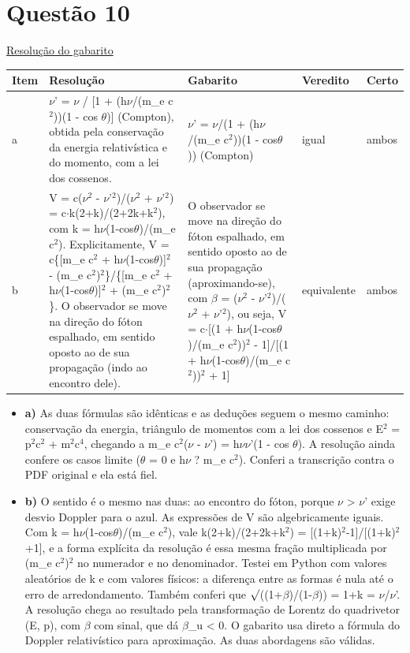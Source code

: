 \documentclass{article}%
\begin{document}
\section*{Questão 10}%
\href{https://poliedroresolve.sistemapoliedro.com.br/vestibulares/ita/2027/ita-2-fase-dia-3-22-10-2026-2-fase-dia-3/dissertativa-10-fisica-2-fase-dia-3-ita-2027}{Resolução do gabarito}\par\smallskip%
\begin{longtable}{@{}p{} p{} p{} p{} p{}@{}}\toprule Item & Resolução & Gabarito & Veredito & Certo \\ \midrule
a & $\nu$' = $\nu$ / {[}1 + (h$\nu$/(m\_e c$^2$))(1 - cos $\theta$){]} (Compton), obtida pela conservação da energia relativística e do momento, com a lei dos cossenos. & $\nu$' = $\nu$/(1 + (h$\nu$/(m\_e c$^2$))(1 - cos$\theta$)) (Compton) & igual & ambos \\
b & V = c($\nu$$^2$ - $\nu$'$^2$)/($\nu$$^2$ + $\nu$'$^2$) = c$\cdot$k(2+k)/(2+2k+k$^2$), com k = h$\nu$(1-cos$\theta$)/(m\_e c$^2$). Explicitamente, V = c\{{[}m\_e c$^2$ + h$\nu$(1-cos$\theta$){]}$^2$ - (m\_e c$^2$)$^2$\}/\{{[}m\_e c$^2$ + h$\nu$(1-cos$\theta$){]}$^2$ + (m\_e c$^2$)$^2$\}. O observador se move na direção do fóton espalhado, em sentido oposto ao de sua propagação (indo ao encontro dele). & O observador se move na direção do fóton espalhado, em sentido oposto ao de sua propagação (aproximando{-}se), com $\beta$ = ($\nu$$^2$ - $\nu$'$^2$)/($\nu$$^2$ + $\nu$'$^2$), ou seja, V = c$\cdot${[}(1 + h$\nu$(1-cos$\theta$)/(m\_e c$^2$))$^2$ - 1{]}/{[}(1 + h$\nu$(1-cos$\theta$)/(m\_e c$^2$))$^2$ + 1{]} & equivalente & ambos \\
\bottomrule\end{longtable}%
\begin{itemize}%
\item%
\textbf{a)} As duas fórmulas são idênticas e as deduções seguem o mesmo caminho: conservação da energia, triângulo de momentos com a lei dos cossenos e E$^2$ = p$^2$c$^2$ + m$^2$c$^{4}$, chegando a m\_e c$^2$($\nu$ - $\nu$') = h$\nu$$\nu$'(1 - cos $\theta$). A resolução ainda confere os casos limite ($\theta$ = 0 e h$\nu$ ? m\_e c$^2$). Conferi a transcrição contra o PDF original e ela está fiel.%
\item%
\textbf{b)} O sentido é o mesmo nas duas: ao encontro do fóton, porque $\nu$ > $\nu$' exige desvio Doppler para o azul. As expressões de V são algebricamente iguais. Com k = h$\nu$(1-cos$\theta$)/(m\_e c$^2$), vale k(2+k)/(2+2k+k$^2$) = {[}(1+k)$^2$-1{]}/{[}(1+k)$^2$+1{]}, e a forma explícita da resolução é essa mesma fração multiplicada por (m\_e c$^2$)$^2$ no numerador e no denominador. Testei em Python com valores aleatórios de k e com valores físicos: a diferença entre as formas é nula até o erro de arredondamento. Também conferi que $\surd$((1+$\beta$)/(1-$\beta$)) = 1+k = $\nu$/$\nu$'. A resolução chega ao resultado pela transformação de Lorentz do quadrivetor (E, p), com $\beta$ com sinal, que dá $\beta$\_u < 0. O gabarito usa direto a fórmula do Doppler relativístico para aproximação. As duas abordagens são válidas.%
\end{itemize}%
\end{document}

